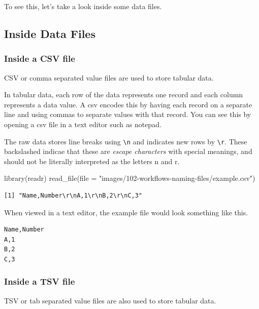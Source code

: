 \documentclass[
  letterpaper,
  DIV=11,
  numbers=noendperiod]{scrreprt}
\newenvironment{Shaded}{\begin{snugshade}}{\end{snugshade}}
\newcommand{\AttributeTok}[1]{\textcolor[rgb]{0.40,0.45,0.13}{#1}}
\newcommand{\FunctionTok}[1]{\textcolor[rgb]{0.28,0.35,0.67}{#1}}
\newcommand{\NormalTok}[1]{\textcolor[rgb]{0.00,0.23,0.31}{#1}}
\newcommand{\StringTok}[1]{\textcolor[rgb]{0.13,0.47,0.30}{#1}}
\begin{document}
To see this, let's take a look inside some data files.

\subsection{Inside Data Files}\label{inside-data-files}

\subsubsection{Inside a CSV file}\label{inside-a-csv-file}

CSV or comma separated value files are used to store tabular data.

In tabular data, each row of the data represents one record and each
column represents a data value. A csv encodes this by having each record
on a separate line and using commas to separate values with that record.
You can see this by opening a csv file in a text editor such as notepad.

The raw data stores line breaks using \texttt{\textbackslash{}n} and
indicates new rows by \texttt{\textbackslash{}r}. These backslashed
indicae that these are \emph{escape characters} with special meanings,
and should not be literally interpreted as the letters n and r.

\begin{Shaded}
\begin{Highlighting}[]
\FunctionTok{library}\NormalTok{(readr)}
\FunctionTok{read\_file}\NormalTok{(}\AttributeTok{file =} \StringTok{"images/102{-}workflows{-}naming{-}files/example.csv"}\NormalTok{)}
\end{Highlighting}
\end{Shaded}

\begin{verbatim}
[1] "Name,Number\r\nA,1\r\nB,2\r\nC,3"
\end{verbatim}

When viewed in a text editor, the example file would look something like
this.

\begin{verbatim}
Name,Number 
A,1
B,2
C,3
\end{verbatim}

\subsubsection{Inside a TSV file}\label{inside-a-tsv-file}

TSV or tab separated value files are also used to store tabular data.
\end{document}
